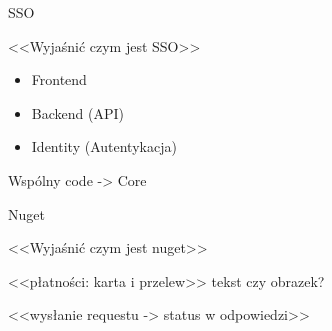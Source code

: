 \documentclass{beamer}
\begin{document}
\begin{frame}{}
	\begin{center}
		\huge{SSO}
	\end{center}
\end{frame}

\begin{frame}{}
	\begin{center}
		\huge{<<Wyjaśnić czym jest SSO>>}
	\end{center}
\end{frame}

\begin{frame}{}
	\begin{huge}
		\begin{itemize}
			\item Frontend
			\item Backend (API)
			\item Identity (Autentykacja)
		\end{itemize}
	\end{huge}
\end{frame}

\begin{frame}{}
	\begin{center}
		\huge{Wspólny code -> Core}
	\end{center}
\end{frame}

\begin{frame}{}
	\begin{center}
		\huge{Nuget}
	\end{center}
\end{frame}

\begin{frame}{}
	\begin{center}
		\huge{<<Wyjaśnić czym jest nuget>>}
	\end{center}
\end{frame}

\begin{frame}{}
	\begin{center}
		\huge{<<płatności: karta i przelew>> tekst czy obrazek?}
	\end{center}
\end{frame}

\begin{frame}{}
	\begin{center}
		\huge{<<wysłanie requestu -> status w odpowiedzi>>}
	\end{center}
\end{frame}
\end{document}
